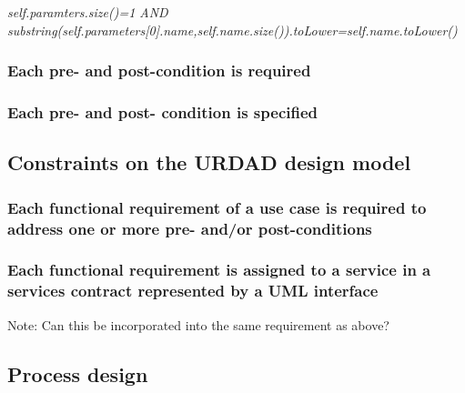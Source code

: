 \textit{
self.paramters.size()=1 AND substring(self.parameters[0].name,self.name.size()).toLower=self.name.toLower()
}




\subsubsection{Each pre- and post-condition is required}


\subsubsection{Each pre- and post- condition is specified}


\subsection{Constraints on the URDAD design model}


\subsubsection{Each functional requirement of a use case is required to address one or more pre- and/or post-conditions}


\subsubsection{Each functional requirement is assigned to a service in a services contract represented by a UML interface}

Note: Can this be incorporated into the same requirement as above?


\subsection{Process design}

